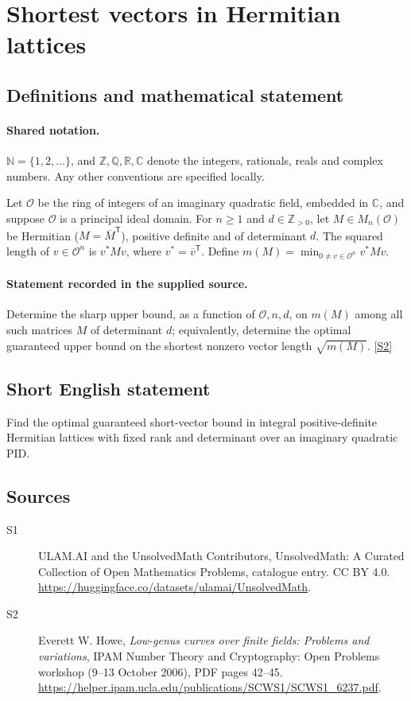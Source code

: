 \documentclass[11pt]{article}
\newcommand{\sref}[2]{\hyperlink{source:#1:#2}{[S#2]}}
\begin{document}
\section{Shortest vectors in Hermitian lattices}\label{statement}

\subsection{Definitions and mathematical statement}

\paragraph{Shared notation.}$\mathbb N=\{1,2,\ldots\}$, and $\mathbb Z,\mathbb Q,\mathbb R,\mathbb C$ denote the integers, rationals, reals and complex numbers. Any other conventions are specified locally.


Let $\mathcal O$ be the ring of integers of an imaginary quadratic field, embedded in $\mathbb C$, and suppose $\mathcal O$ is a principal ideal domain. For $n\ge1$ and $d\in\mathbb Z_{>0}$, let $M\in M_n(\mathcal O)$ be Hermitian ($M=\overline M^{\mathsf T}$), positive definite and of determinant $d$. The squared length of $v\in\mathcal O^n$ is $v^*Mv$, where $v^*=\overline v^{\mathsf T}$. Define $m(M)=\min_{0\ne v\in\mathcal O^n}v^*Mv$.
\paragraph{Statement recorded in the supplied source.}
Determine the sharp upper bound, as a function of $\mathcal O,n,d$, on $m(M)$ among all such matrices $M$ of determinant $d$; equivalently, determine the optimal guaranteed upper bound on the shortest nonzero vector length $\sqrt{m(M)}$. \sref{statement}{2}

\subsection{Short English statement}
Find the optimal guaranteed short-vector bound in integral positive-definite Hermitian lattices with fixed rank and determinant over an imaginary quadratic PID.
\subsection{Sources}
\begin{description}
\item[\hypertarget{source:statement:1}{S1}] ULAM.AI and the UnsolvedMath Contributors, UnsolvedMath: A Curated Collection of Open Mathematics Problems, catalogue entry. CC BY 4.0. \url{https://huggingface.co/datasets/ulamai/UnsolvedMath}.
\item[\hypertarget{source:statement:2}{S2}] Everett W. Howe, \emph{Low-genus curves over finite fields: Problems and variations}, IPAM Number Theory and Cryptography: Open Problems workshop (9--13 October 2006), PDF pages 42--45. \url{https://helper.ipam.ucla.edu/publications/SCWS1/SCWS1_6237.pdf}.
\end{description}
\label{end:statement}
\end{document}
